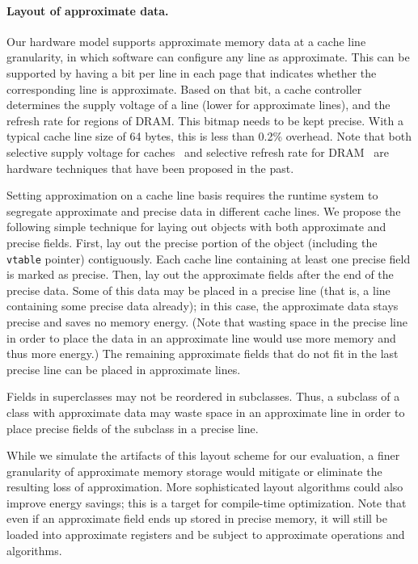 \paragraph{Layout of approximate data.} Our hardware model supports
approximate memory data at a cache line granularity, in which software
can configure any line as approximate. This can be supported by having a
bit per line in each page that indicates whether the corresponding line is
approximate. Based on that bit, a cache controller determines
the supply voltage of a line (lower for approximate lines), and the
refresh rate for regions of DRAM\@. This bitmap needs to be kept
precise. With a typical cache line size of 64 bytes, this is less
than 0.2\% overhead. Note that both selective supply voltage for
caches~\cite{drowsycaches} and selective refresh rate for
DRAM~\cite{smartrefresh} are hardware techniques that have been
proposed in the past.

Setting approximation on a cache line basis requires the runtime
system to segregate approximate and precise data in different
cache lines. We propose the following simple
technique for laying out objects with both approximate and precise
fields. First, lay out the precise portion of the object (including
the \texttt{vtable} pointer) contiguously. Each cache line containing at least
one precise field is marked as precise. Then, lay out the approximate
fields after the end of the precise data. Some of this data may
be placed in a precise line (that is, a line containing some precise
data already); in this case, the approximate data stays precise and
saves no memory energy.
(Note that wasting space in the precise line in order to place the
data in an approximate line would use more memory and thus more
energy.)
The remaining approximate fields that do not
fit in the last precise line can be placed in approximate lines.

Fields in superclasses may not be reordered in subclasses.
Thus, a subclass of a class with approximate data may waste space in
an approximate line in order to place precise fields of the subclass
in a precise line.

While we simulate the artifacts of this layout scheme for our evaluation,
a finer granularity of approximate memory storage would mitigate or
eliminate the resulting loss of approximation.
More sophisticated layout algorithms could also improve energy savings;
this is a target for compile-time optimization.
Note that
even if an approximate field ends up stored in precise memory, it will
still be loaded into approximate registers and be subject to
approximate operations and algorithms.

